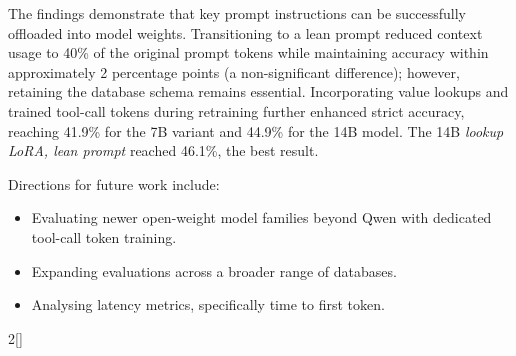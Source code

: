 The findings demonstrate that key prompt instructions can be successfully offloaded into model weights. Transitioning to a lean prompt reduced context usage to 40\% of the original prompt tokens while maintaining accuracy within approximately 2 percentage points (a non-significant difference); however, retaining the database schema remains essential. Incorporating value lookups and trained tool-call tokens during retraining further enhanced strict accuracy, reaching 41.9\% for the 7B variant and 44.9\% for the 14B model. The 14B \emph{lookup LoRA, lean prompt} reached 46.1\%, the best result.

Directions for future work include:
\begin{itemize}[nosep,leftmargin=1.5em]
\item Evaluating newer open-weight model families beyond Qwen with dedicated tool-call token training.
\item Expanding evaluations across a broader range of databases.
\item Analysing latency metrics, specifically time to first token.
\end{itemize}


\smallskip{}

{\scriptsize
\let\oldthebibliography\thebibliography
\renewcommand\thebibliography[1]{\oldthebibliography{#1}\setlength{\itemsep}{0pt}\setlength{\parsep}{0pt}\setlength{\parskip}{0pt}}
\setlength{\multicolsep}{0pt}\begin{multicols}{2}[]\renewcommand{\section}[2]{}\setlength{\parskip}{0pt}
\end{multicols}
}
